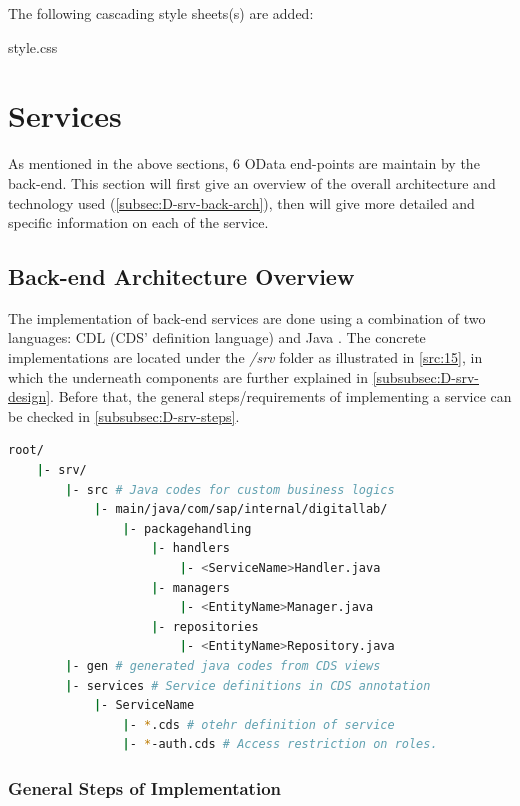\bigskip
The following cascading style sheets(s) are added:
\begin{compactenum}
    \item style.css
\end{compactenum}


\section{Services}
\label{sec:D-srv}

As mentioned in the above sections, 6 OData end-points are maintain by the back-end. This section will first give an overview of the overall architecture and technology used (\autoref{subsec:D-srv-back-arch}), then will give more detailed and specific information on each of the service.

\subsection{Back-end Architecture Overview}
\label{subsec:D-srv-back-arch}

The implementation of back-end services are done using a combination of two languages: CDL (CDS' definition language) \cite{cap-cds-lang} and Java \cite{java}. The concrete implementations are located under the \textit{/srv} folder as illustrated in \autoref{src:15}, in which the underneath components are further explained in \autoref{subsubsec:D-srv-design}. Before that, the general steps/requirements of implementing a service can be checked in \autoref{subsubsec:D-srv-steps}. 

\begin{lstlisting}[language={bash}]
root/
    |- srv/
        |- src # Java codes for custom business logics
            |- main/java/com/sap/internal/digitallab/
                |- packagehandling
                    |- handlers
                        |- <ServiceName>Handler.java
                    |- managers
                        |- <EntityName>Manager.java
                    |- repositories
                        |- <EntityName>Repository.java
        |- gen # generated java codes from CDS views
        |- services # Service definitions in CDS annotation
            |- ServiceName 
                |- *.cds # otehr definition of service
                |- *-auth.cds # Access restriction on roles.
\end{lstlisting}

\subsubsection{General Steps of Implementation}
\label{subsubsec:D-srv-steps}

